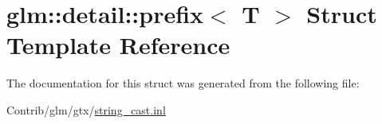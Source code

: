 \hypertarget{structglm_1_1detail_1_1prefix}{}\section{glm\+:\+:detail\+:\+:prefix$<$ T $>$ Struct Template Reference}
\label{structglm_1_1detail_1_1prefix}


The documentation for this struct was generated from the following file\+:\begin{DoxyCompactItemize}
\item 
Contrib/glm/gtx/\mbox{\hyperlink{string__cast_8inl}{string\+\_\+cast.\+inl}}\end{DoxyCompactItemize}
